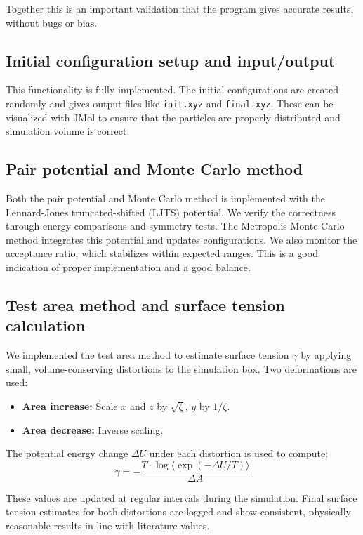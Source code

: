 \documentclass{article}
\begin{document}
Together this is an important validation that the program gives accurate results, without bugs or bias. 

\subsection*{Initial configuration setup and input/output}

This functionality is fully implemented. The initial configurations are created randomly and gives output files like \texttt{init.xyz} and \texttt{final.xyz}. These can be visualized with JMol to ensure that the particles are properly distributed and simulation volume is correct.

\subsection*{Pair potential and Monte Carlo method}

Both the pair potential and Monte Carlo method is implemented with the Lennard-Jones truncated-shifted (LJTS) potential. We verify the correctness through energy comparisons and symmetry tests. The Metropolis Monte Carlo method integrates this potential and updates configurations. We also monitor the acceptance ratio, which stabilizes within expected ranges. This is a good indication of proper implementation and a good balance. 

\subsection*{Test area method and surface tension calculation}

We implemented the test area method to estimate surface tension $\gamma$ by applying small, volume-conserving distortions to the simulation box. Two deformations are used:
\begin{itemize}
    \item \textbf{Area increase:} Scale $x$ and $z$ by $\sqrt{\zeta}$, $y$ by $1/\zeta$.
    \item \textbf{Area decrease:} Inverse scaling.
\end{itemize}

The potential energy change $\Delta U$ under each distortion is used to compute:
\[
\gamma = -\frac{T \cdot \log \langle \exp(-\Delta U / T) \rangle}{\Delta A}
\]

These values are updated at regular intervals during the simulation. Final surface tension estimates for both distortions are logged and show consistent, physically reasonable results in line with literature values.
\end{document}

